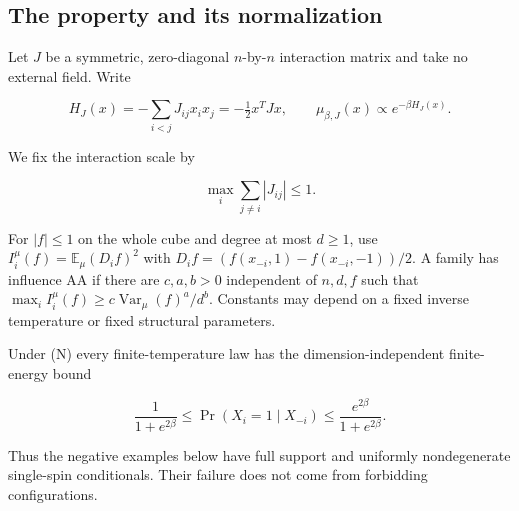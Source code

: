 \subsection{The property and its
normalization}\label{proof:local_interactions:the-property-and-its-normalization}

Let \(J\) be a symmetric, zero-diagonal \(n\)-by-\(n\) interaction matrix and take
no external field. Write

\[
H_J(x)=-\sum_{i<j}J_{ij}x_ix_j=-\tfrac12x^TJx,
\qquad
\mu_{\beta,J}(x)\propto e^{-\beta H_J(x)}.
\]

We fix the interaction scale by

\[
\max_i\sum_{j\ne i}|J_{ij}|\le1.
\tag{N}
\]

For \(|f|\le 1\) on the whole cube and degree at most \(d\ge 1\), use
\(I_i^\mu (f)=\mathbb{E}_\mu (D_if)^{2}\) with
\(D_if=(f(x_{-i},1)-f(x_{-i},-1))/2\). A family has influence AA if
there are \(c,a,b>0\) independent of \(n,d,f\) such that
\(\max _i I_i^\mu (f)\ge c \operatorname{Var}_\mu (f)^a/d^b\). Constants
may depend on a fixed inverse temperature or fixed structural
parameters.

Under (N) every finite-temperature law has the dimension-independent
finite-energy bound

\[
\frac1{1+e^{2\beta}}\le\Pr(X_i=1\mid X_{-i})\le\frac{e^{2\beta}}{1+e^{2\beta}}.
\tag{FE}
\]

Thus the negative examples below have full support and uniformly
nondegenerate single-spin conditionals. Their failure does not come from
forbidding configurations.
